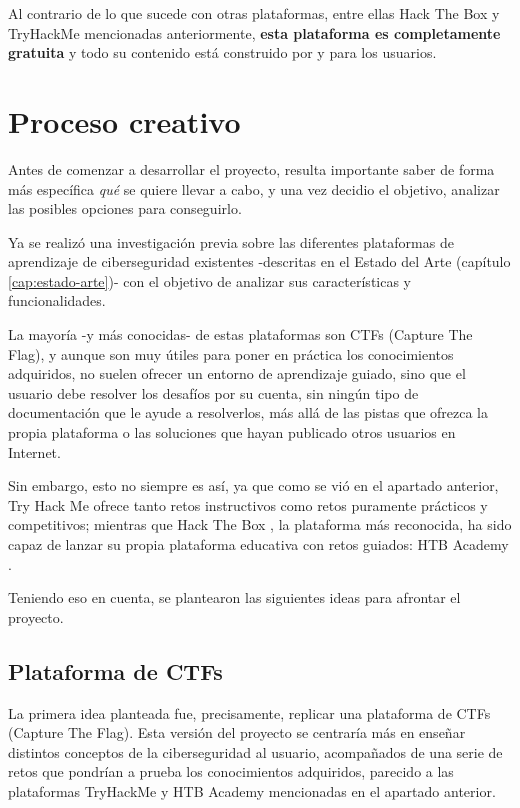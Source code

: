             Al contrario de lo que sucede con otras plataformas, entre ellas Hack The Box y TryHackMe mencionadas anteriormente, \textbf{esta plataforma es completamente gratuita} y todo su contenido está construido por y para los usuarios.
            
            \newpage


    \section{Proceso creativo}
        \label{sec:proceso-creativo}

        Antes de comenzar a desarrollar el proyecto, resulta importante saber de forma más específica \textit{qué} se quiere llevar a cabo, y una vez decidio el objetivo, analizar las posibles opciones para conseguirlo.
        
        Ya se realizó una investigación previa sobre las diferentes plataformas de aprendizaje de ciberseguridad existentes -descritas en el Estado del Arte (capítulo \ref{cap:estado-arte})- con el objetivo de analizar sus características y funcionalidades.
        
        La mayoría -y más conocidas- de estas plataformas son CTFs (Capture The Flag), y aunque son muy útiles para poner en práctica los conocimientos adquiridos, no suelen ofrecer un entorno de aprendizaje guiado, sino que el usuario debe resolver los desafíos por su cuenta, sin ningún tipo de documentación que le ayude a resolverlos, más allá de las pistas que ofrezca la propia plataforma o las soluciones que hayan publicado otros usuarios en Internet.

        Sin embargo, esto no siempre es así, ya que como se vió en el apartado anterior, Try Hack Me \cite{tryhackme} ofrece tanto retos instructivos como retos puramente prácticos y competitivos; mientras que Hack The Box \cite{hackthebox}, la plataforma más reconocida, ha sido capaz de lanzar su propia plataforma educativa con retos guiados: HTB Academy \cite{hackthebox-academy}.

        Teniendo eso en cuenta, se plantearon las siguientes ideas para afrontar el proyecto.

        \subsection{Plataforma de CTFs}

            La primera idea planteada fue, precisamente, replicar una plataforma de CTFs (Capture The Flag). Esta versión del proyecto se centraría más en enseñar distintos conceptos de la ciberseguridad al usuario, acompañados de una serie de retos que pondrían a prueba los conocimientos adquiridos, parecido a las plataformas TryHackMe y HTB Academy mencionadas en el apartado anterior.


